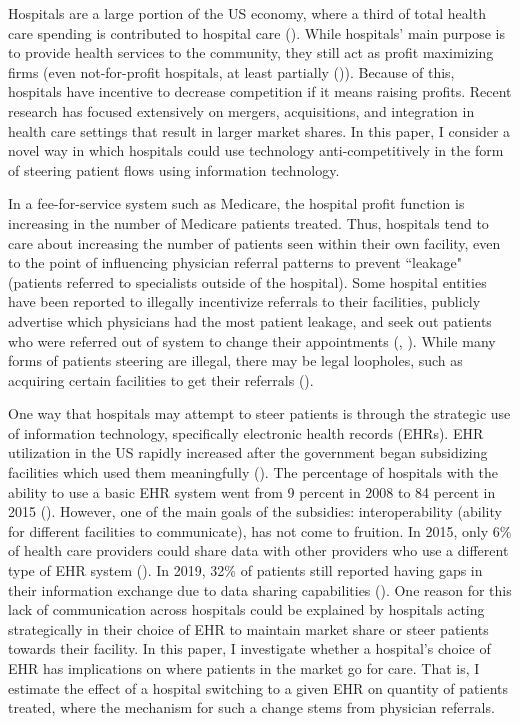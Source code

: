 \documentclass[12pt]{article}
\begin{document}
    Hospitals are a large portion of the US economy, where a third of total health care spending is contributed to hospital care (\cite{nunn2020dozen}). While hospitals' main purpose is to provide health services to the community, they still act as profit maximizing firms (even not-for-profit hospitals, at least partially (\cite{chang2011nonprofit})). Because of this, hospitals have incentive to decrease competition if it means raising profits. Recent research has focused extensively on mergers, acquisitions, and integration in health care settings that result in larger market shares. In this paper, I consider a novel way in which hospitals could use technology anti-competitively in the form of steering patient flows using information technology. 

    In a fee-for-service system such as Medicare, the hospital profit function is increasing in the number of Medicare patients treated. Thus, hospitals tend to care about increasing the number of patients seen within their own facility, even to the point of influencing physician referral patterns to prevent ``leakage" (patients referred to specialists outside of the hospital). Some hospital entities have been reported to illegally incentivize referrals to their facilities, publicly advertise which physicians had the most patient leakage, and seek out patients who were referred out of system to change their appointments (\cite{ellison_2018}, \cite{dyrda_2021}). While many forms of patients steering are illegal, there may be legal loopholes, such as acquiring certain facilities to get their referrals (\cite{nakamura2010hospital}). 
    
    One way that hospitals may attempt to steer patients is through the strategic use of information technology, specifically electronic health records (EHRs). EHR utilization in the US rapidly increased after the government began subsidizing facilities which used them meaningfully (\cite{hitech}). The percentage of hospitals with the ability to use a basic EHR system went from 9 percent in 2008 to 84 percent in 2015 (\cite{stats}). However, one of the main goals of the subsidies: interoperability (ability for different facilities to communicate), has not come to fruition. In 2015, only 6\% of health care providers could share data with other providers who use a different type of EHR system (\cite{reisman2017ehrs}). In 2019, 32\% of patients still reported having gaps in their information exchange due to data sharing capabilities (\cite{gaps}). One reason for this lack of communication across hospitals could be explained by hospitals acting strategically in their choice of EHR to maintain market share or steer patients towards their facility. In this paper, I investigate whether a hospital's choice of EHR has implications on where patients in the market go for care. That is, I estimate the effect of a hospital switching to a given EHR on quantity of patients treated, where the mechanism for such a change stems from physician referrals. 
\end{document}
